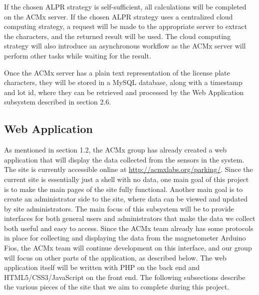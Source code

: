\documentclass[11pt, oneside, fullpage, doublespace]{article}
\begin{document}
If the chosen ALPR strategy is self-sufficient, all calculations will be completed on the ACMx server. If the chosen ALPR strategy uses a centralized cloud computing strategy, a request will be made to the appropriate server to extract the characters, and the returned result will be used. The cloud computing strategy will also introduce an asynchronous workflow as the ACMx server will perform other tasks while waiting for the result.

Once the ACMx server has a plain text representation of the license plate characters, they will be stored in a MySQL database, along with a timestamp and lot id, where they can be retrieved and processed by the Web Application subsystem described in section 2.6.

\subsection{Web Application}
As mentioned in section 1.2, the ACMx group has already created a web application that will display the data collected from the sensors in the system. The site is currently accessible online at \url{http://acmxlabs.org/parking/}. Since the current site is essentially just a shell with no data, one main goal of this project is to make the main pages of the site fully functional. Another main goal is to create an administrator side to the site, where data can be viewed and updated by site administrators. The main focus of this subsystem will be to provide interfaces for both general users and administrators that make the data we collect both useful and easy to access. Since the ACMx team already has some protocols in place for collecting and displaying the data from the magnetometer Arduino Fios, the ACMx team will continue development on this interface, and our group will focus on other parts of the application, as described below. The web application itself will be written with PHP on the back end and HTML5/CSS3/JavaScript on the front end. The following subsections describe the various pieces of the site that we aim to complete during this project.
\end{document}
